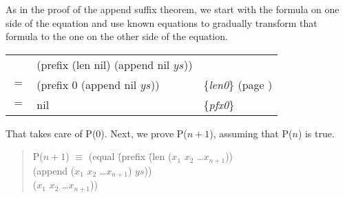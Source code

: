 As in the proof of the append suffix theorem, we start with the formula on one side of the equation and use known equations to gradually transform that formula to the one on the other side of the equation.

\begin{center}
\begin{tabular}{lll}
    & (prefix (len nil) (append nil $ys$))  &                                                      \\
$=$ & (prefix 0 (append nil $ys$))          & \{\emph{len0}\} (page \pageref{len-equations})   \\
$=$ & nil                                   & \{\emph{pfx0}\}                                      \\
\end{tabular}
\end{center}

That takes care of P(0). Next, we prove P($n+1$), assuming that P($n$) is true.

\begin{quote}
\begin{tabbing}
P($n+1$) $\equiv$ (equal \=(prefix \=(len ($x_1$ $x_2$ \dots $x_{n+1}$))        \\
                       \>        \>(append ($x_1$ $x_2$ \dots $x_{n+1}$) $ys$)) \\
                       \>($x_1$ $x_2$ \dots $x_{n+1}$))                         \\
\end{tabbing}
\end{quote}


